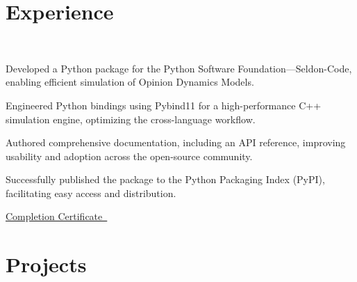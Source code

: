 \documentclass[]{resume}
\begin{document}
%
%
\lastupdated

%
%

%
%

\begin{minipage}[t]{0.60\textwidth}


\section{Experience}
\\
\vspace{\topsep}
\begin{tightemize}
\item Developed a Python package for the Python Software Foundation—Seldon-Code, enabling efficient simulation of Opinion Dynamics Models.
\item Engineered Python bindings using Pybind11 for a high-performance C++ simulation engine, optimizing the cross-language workflow.
\item Authored comprehensive documentation, including an API reference, improving usability and adoption across the open-source community.
\item Successfully published the package to the Python Packaging Index (PyPI), facilitating easy access and distribution.
\item \href{https://github.com/User-DK/Resume/blob/main/assets/gsoc_completion_certificate_2024.jpg}{Completion Certificate\faLink\ }
\end{tightemize}
\sectionsep

\section{Projects}


\end{minipage}
\end{document}
